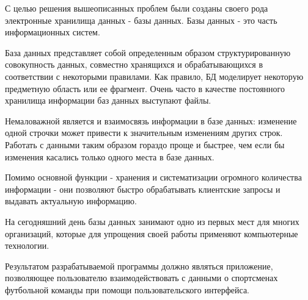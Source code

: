 С целью решения вышеописанных проблем были созданы своего рода электронные хранилища данных - базы данных. Базы данных - это часть информационных систем.

База данных представляет собой определенным образом структурированную совокупность данных, совместно хранящихся и обрабатывающихся в соответствии с некоторыми правилами. Как правило, БД моделирует некоторую предметную область или ее фрагмент. Очень часто в качестве постоянного хранилища информации баз данных выступают файлы.

Немаловажной является и взаимосвязь информации в базе данных: изменение одной строчки может привести к значительным изменениям других строк. Работать с данными таким образом гораздо проще и быстрее, чем если бы изменения касались только одного места в базе данных.

Помимо основной функции - хранения и систематизации огромного количества информации - они позволяют быстро обрабатывать клиентские запросы и выдавать актуальную информацию.

На сегодняшний день базы данных занимают одно из первых мест для многих организаций, которые для упрощения своей работы применяют компьютерные технологии.

Результатом разрабатываемой программы должно являться приложение, позволяющее пользователю взаимодействовать с данными о спортсменах футбольной команды при помощи пользовательского интерфейса.

\newpage

